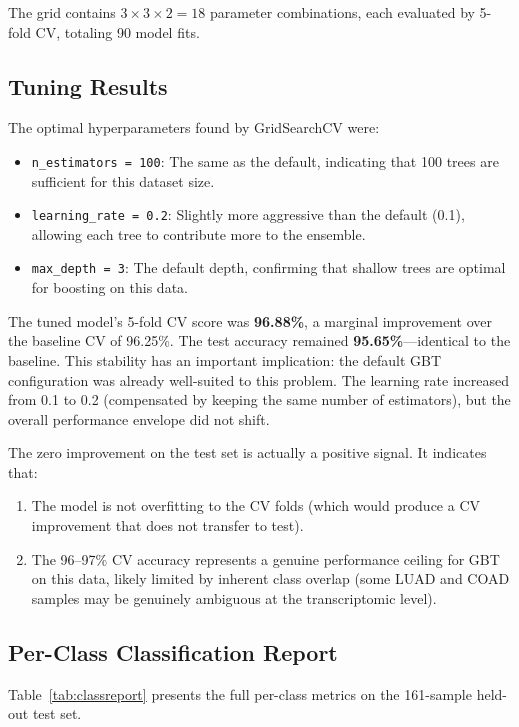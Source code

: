 \documentclass{article}
\begin{document}
The grid contains $3 \times 3 \times 2 = 18$ parameter combinations, each evaluated by 5-fold CV, totaling 90 model fits.

\subsection{Tuning Results}
The optimal hyperparameters found by GridSearchCV were:
\begin{itemize}[leftmargin=2em]
\item \texttt{n\_estimators = 100}: The same as the default, indicating that 100 trees are sufficient for this dataset size.
\item \texttt{learning\_rate = 0.2}: Slightly more aggressive than the default (0.1), allowing each tree to contribute more to the ensemble.
\item \texttt{max\_depth = 3}: The default depth, confirming that shallow trees are optimal for boosting on this data.
\end{itemize}

The tuned model's 5-fold CV score was \textbf{96.88\%}, a marginal improvement over the baseline CV of 96.25\%. The test accuracy remained \textbf{95.65\%}---identical to the baseline. This stability has an important implication: the default GBT configuration was already well-suited to this problem. The learning rate increased from 0.1 to 0.2 (compensated by keeping the same number of estimators), but the overall performance envelope did not shift.

The zero improvement on the test set is actually a positive signal. It indicates that:
\begin{enumerate}[leftmargin=2em]
\item The model is not overfitting to the CV folds (which would produce a CV improvement that does not transfer to test).
\item The 96--97\% CV accuracy represents a genuine performance ceiling for GBT on this data, likely limited by inherent class overlap (some LUAD and COAD samples may be genuinely ambiguous at the transcriptomic level).
\end{enumerate}

\subsection{Per-Class Classification Report}
Table~\ref{tab:classreport} presents the full per-class metrics on the 161-sample held-out test set.
\end{document}
